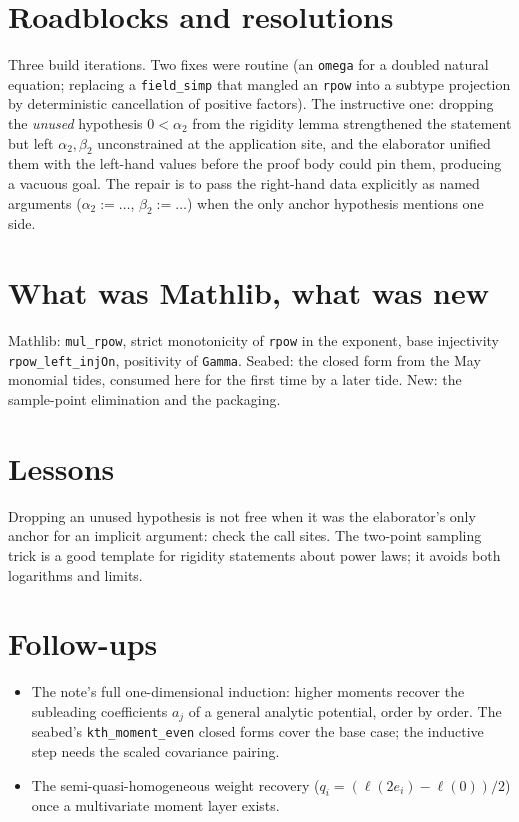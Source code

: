 \documentclass[11pt]{article}
\begin{document}
\section{Roadblocks and resolutions}

Three build iterations. Two fixes were routine (an \texttt{omega} for a
doubled natural equation; replacing a \texttt{field\_simp} that mangled
an \texttt{rpow} into a subtype projection by deterministic
cancellation of positive factors). The instructive one: dropping the
\emph{unused} hypothesis $0 < \alpha_2$ from the rigidity lemma
strengthened the statement but left $\alpha_2, \beta_2$ unconstrained at
the application site, and the elaborator unified them with the left-hand
values before the proof body could pin them, producing a vacuous goal.
The repair is to pass the right-hand data explicitly as named arguments
($\alpha_2 := \ldots$, $\beta_2 := \ldots$) when the only anchor
hypothesis mentions one side.

\section{What was Mathlib, what was new}

Mathlib: \texttt{mul\_rpow}, strict monotonicity of \texttt{rpow} in the
exponent, base injectivity \texttt{rpow\_left\_injOn}, positivity of
\texttt{Gamma}. Seabed: the closed form from the May monomial tides,
consumed here for the first time by a later tide. New: the sample-point
elimination and the packaging.

\section{Lessons}

Dropping an unused hypothesis is not free when it was the elaborator's
only anchor for an implicit argument: check the call sites. The
two-point sampling trick is a good template for rigidity statements
about power laws; it avoids both logarithms and limits.

\section{Follow-ups}

\begin{itemize}
\item The note's full one-dimensional induction: higher moments
recover the subleading coefficients $a_j$ of a general analytic
potential, order by order. The seabed's \texttt{kth\_moment\_even}
closed forms cover the base case; the inductive step needs the scaled
covariance pairing.
\item The semi-quasi-homogeneous weight recovery
($q_i = (\ell(2e_i) - \ell(0))/2$) once a multivariate moment layer
exists.
\end{itemize}
\end{document}
